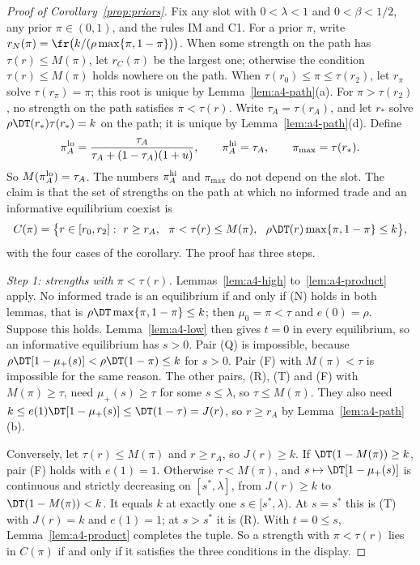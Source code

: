 \begin{proof}[Proof of Corollary~\ref{prop:priors}]
Fix any slot with \(0<\lambda<1\) and \(0<\beta<1/2\), any prior \(\pi\in(0,1)\), and the rules IM and C1. For a
prior \(\pi\), write \(r_N(\pi)=\fr\bigl(k/(\rho\max\{\pi,1-\pi\})\bigr)\). When some strength on the path has
\(\tau(r)\le M(\pi)\), let \(r_C(\pi)\) be the largest one; otherwise the condition \(\tau(r)\le M(\pi)\) holds
nowhere on the path. When \(\tau(r_0)\le\pi\le\tau(r_2)\), let \(r_\pi\) solve \(\tau(r_\pi)=\pi\); this root is
unique by Lemma~\ref{lem:a4-path}(a). For \(\pi>\tau(r_2)\), no strength on the path satisfies \(\pi<\tau(r)\).
Write \(\tau_A=\tau(r_A)\), and let \(r_*\) solve \(\rho\DT(r_*)\tau(r_*)=k\) on the path; it is unique by
Lemma~\ref{lem:a4-path}(d). Define
\[
\pi_A^{\rm lo}=\frac{\tau_A}{\tau_A+(1-\tau_A)(1+u)},\qquad \pi_A^{\rm hi}=\tau_A,\qquad \pi_{\max}=\tau(r_*).
\]
So \(M(\pi_A^{\rm lo})=\tau_A\). The numbers \(\pi_A^{\rm hi}\) and \(\pi_{\max}\) do not depend on the slot. The
claim is that the set of strengths on the path at which no informed trade and an informative equilibrium coexist is
\[
C(\pi)=\bigl\{r\in[r_0,r_2]:\ r\ge r_A,\ \ \pi<\tau(r)\le M(\pi),\ \ \rho\DT(r)\max\{\pi,1-\pi\}\le k\bigr\},
\]
with the four cases of the corollary. The proof has three steps.

\emph{Step 1: strengths with \(\pi<\tau(r)\).} Lemmas~\ref{lem:a4-high} to~\ref{lem:a4-product} apply. No informed
trade is an equilibrium if and only if (N) holds in both lemmas, that is \(\rho\DT\max\{\pi,1-\pi\}\le k\); then
\(\mu_0=\pi<\tau\) and \(e(0)=\rho\). Suppose this holds. Lemma~\ref{lem:a4-low} then gives \(t=0\) in every
equilibrium, so an informative equilibrium has \(s>0\). Pair (Q) is impossible, because
\(\rho\DT[1-\mu_+(s)]<\rho\DT(1-\pi)\le k\) for \(s>0\). Pair (F) with \(M(\pi)<\tau\) is impossible for the same
reason. The other pairs, (R), (T) and (F) with \(M(\pi)\ge\tau\), need \(\mu_+(s)\ge\tau\) for some
\(s\le\lambda\), so \(\tau\le M(\pi)\). They also need \(k\le e(1)\DT[1-\mu_+(s)]\le\DT(1-\tau)=J(r)\), so
\(r\ge r_A\) by Lemma~\ref{lem:a4-path}(b).

Conversely, let \(\tau(r)\le M(\pi)\) and \(r\ge r_A\), so \(J(r)\ge k\). If \(\DT(1-M(\pi))\ge k\), pair (F) holds
with \(e(1)=1\). Otherwise \(\tau<M(\pi)\), and \(s\mapsto\DT[1-\mu_+(s)]\) is continuous and strictly decreasing on
\([s^*,\lambda]\), from \(J(r)\ge k\) to \(\DT(1-M(\pi))<k\). It equals \(k\) at exactly one
\(s\in[s^*,\lambda)\). At \(s=s^*\) this is (T) with \(J(r)=k\) and \(e(1)=1\); at \(s>s^*\) it is (R). With
\(t=0\le s\), Lemma~\ref{lem:a4-product} completes the tuple. So a strength with \(\pi<\tau(r)\) lies in \(C(\pi)\)
if and only if it satisfies the three conditions in the display.


\end{proof}
